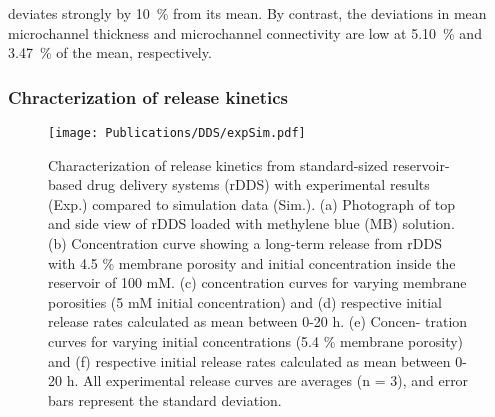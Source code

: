 deviates strongly by 10~\% from its mean. By contrast, the deviations in mean microchannel thickness and microchannel connectivity are low at 5.10~\% and 3.47~\% of the mean, respectively.



\subsubsection{Chracterization of release kinetics}
\begin{figure}[ht!]
  \centering
  \texttt{[image: Publications/DDS/expSim.pdf]}
  \caption{Characterization of release kinetics from standard-sized reservoir-based drug delivery systems (rDDS) with experimental results (Exp.) compared to simulation data (Sim.). (a) Photograph of top and side view of rDDS loaded with methylene blue (MB) solution. (b) Concentration curve showing a long-term release from rDDS with 4.5 \% membrane porosity and initial concentration inside the reservoir of 100 mM. (c) concentration curves for varying membrane porosities (5 mM initial concentration) and (d) respective initial release rates calculated as mean between 0-20 h. (e) Concen-
  tration curves for varying initial concentrations (5.4 \% membrane porosity) and (f) respective initial release rates calculated as mean between 0-20 h. All experimental release curves are averages (n = 3), and error bars represent the standard deviation.}
  \label{fig:expSim}
\end{figure}
